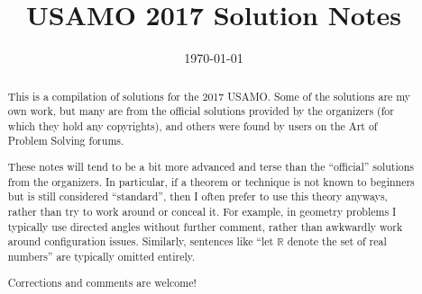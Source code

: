 \documentclass[11pt]{scrartcl}
\title{USAMO 2017 Solution Notes}
\date{\today}
\begin{document}
\maketitle

\begin{abstract}
This is a compilation of solutions
for the 2017 USAMO.
Some of the solutions are my own work,
but many are from the official solutions provided by the organizers
(for which they hold any copyrights),
and others were found by users on the Art of Problem Solving forums.

These notes will tend to be a bit more advanced and terse than the ``official''
solutions from the organizers.
In particular, if a theorem or technique is not known to beginners
but is still considered ``standard'', then I often prefer to
use this theory anyways, rather than try to work around or conceal it.
For example, in geometry problems I typically use directed angles
without further comment, rather than awkwardly work around configuration issues.
Similarly, sentences like ``let $\mathbb{R}$ denote the set of real numbers''
are typically omitted entirely.

Corrections and comments are welcome!
\end{abstract}

\tableofcontents
\newpage

\addtocounter{section}{-1}
\end{document}
